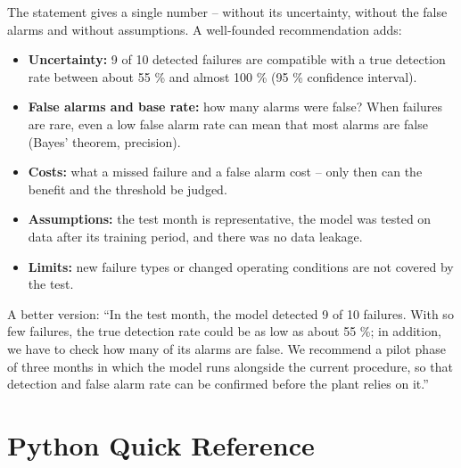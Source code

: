 \documentclass[
  letterpaper,
  DIV=11,
  numbers=noendperiod]{scrreprt}
\providecommand{\tightlist}{%
  \setlength{\itemsep}{0pt}\setlength{\parskip}{0pt}}\usepackage{longtable,booktabs,array}
\begin{document}
\begin{tcolorbox}[enhanced jigsaw, left=2mm, title=\textcolor{quarto-callout-caution-color}{\faFire}\hspace{0.5em}{Solution to Question 12}, opacityback=0, breakable, rightrule=.15mm, arc=.35mm, toptitle=1mm, colbacktitle=quarto-callout-caution-color!10!white, opacitybacktitle=0.6, coltitle=black, colframe=quarto-callout-caution-color-frame, bottomrule=.15mm, leftrule=.75mm, bottomtitle=1mm, titlerule=0mm, toprule=.15mm, colback=white]

The statement gives a single number -- without its uncertainty, without
the false alarms and without assumptions. A well-founded recommendation
adds:

\begin{itemize}
\tightlist
\item
  \textbf{Uncertainty:} 9 of 10 detected failures are compatible with a
  true detection rate between about 55 \% and almost 100 \% (95 \%
  confidence interval).
\item
  \textbf{False alarms and base rate:} how many alarms were false? When
  failures are rare, even a low false alarm rate can mean that most
  alarms are false (Bayes' theorem, precision).
\item
  \textbf{Costs:} what a missed failure and a false alarm cost -- only
  then can the benefit and the threshold be judged.
\item
  \textbf{Assumptions:} the test month is representative, the model was
  tested on data after its training period, and there was no data
  leakage.
\item
  \textbf{Limits:} new failure types or changed operating conditions are
  not covered by the test.
\end{itemize}

A better version: ``In the test month, the model detected 9 of 10
failures. With so few failures, the true detection rate could be as low
as about 55 \%; in addition, we have to check how many of its alarms are
false. We recommend a pilot phase of three months in which the model
runs alongside the current procedure, so that detection and false alarm
rate can be confirmed before the plant relies on it.''

\end{tcolorbox}

\cleardoublepage
{}
{}
\appendix

\chapter{Python Quick Reference}\label{sec-python-reference}
\end{document}
